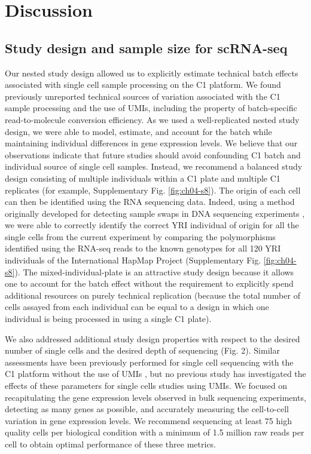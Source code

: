 \section{Discussion}\label{ch04-discussion}

\subsection{Study design and sample size for
scRNA-seq}\label{study-design-and-sample-size-for-scrna-seq}

Our nested study design allowed us to explicitly estimate technical
batch effects associated with single cell sample processing on the C1
platform. We found previously unreported technical sources of variation
associated with the C1 sample processing and the use of UMIs, including
the property of batch-specific read-to-molecule conversion efficiency.
As we used a well-replicated nested study design, we were able to model,
estimate, and account for the batch while maintaining individual
differences in gene expression levels. We believe that our observations
indicate that future studies should avoid confounding C1 batch and
individual source of single cell samples. Instead, we recommend a
balanced study design consisting of multiple individuals within a C1
plate and multiple C1 replicates (for example, Supplementary Fig. \ref{fig:ch04-s8}).
The origin of each cell can then be identified using the RNA sequencing
data. Indeed, using a method originally developed for detecting sample
swaps in DNA sequencing experiments \citep{Jun2012}, we were able to
correctly identify the correct YRI individual of origin for all the
single cells from the current experiment by comparing the polymorphisms
identified using the RNA-seq reads to the known genotypes for all 120
YRI individuals of the International HapMap Project
\citep{HapMapConsortium2005} (Supplementary Fig. \ref{fig:ch04-s8}). The
mixed-individual-plate is an attractive study design because it allows
one to account for the batch effect without the requirement to
explicitly spend additional resources on purely technical replication
(because the total number of cells assayed from each individual can be
equal to a design in which one individual is being processed in using a
single C1 plate).

We also addressed additional study design properties with respect to the
desired number of single cells and the desired depth of sequencing (Fig.
2). Similar assessments have been previously performed for single cell
sequencing with the C1 platform without the use of UMIs \citep{Wu2014,
Pollen2014}, but no previous study has investigated the effects of
these parameters for single cells studies using UMIs. We focused on
recapitulating the gene expression levels observed in bulk sequencing
experiments, detecting as many genes as possible, and accurately
measuring the cell-to-cell variation in gene expression levels. We
recommend sequencing at least 75 high quality cells per biological
condition with a minimum of 1.5 million raw reads per cell to obtain
optimal performance of these three metrics.

